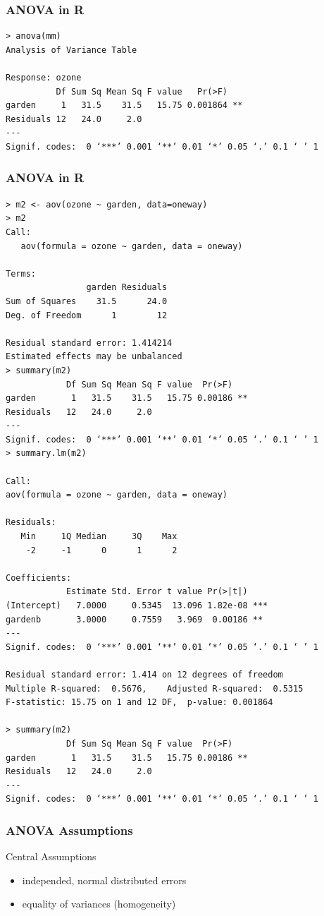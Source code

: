 \begin{frame}[fragile]\frametitle{ANOVA in R}
\footnotesize
\begin{verbatim}
> anova(mm)
Analysis of Variance Table

Response: ozone
          Df Sum Sq Mean Sq F value   Pr(>F)   
garden     1   31.5    31.5   15.75 0.001864 **
Residuals 12   24.0     2.0                    
---
Signif. codes:  0 ‘***’ 0.001 ‘**’ 0.01 ‘*’ 0.05 ‘.’ 0.1 ‘ ’ 1
\end{verbatim}
\end{frame}



\begin{frame}\frametitle{ANOVA in R}
\footnotesize
\begin{verbatim}
> m2 <- aov(ozone ~ garden, data=oneway)
> m2
Call:
   aov(formula = ozone ~ garden, data = oneway)

Terms:
                garden Residuals
Sum of Squares    31.5      24.0
Deg. of Freedom      1        12

Residual standard error: 1.414214
Estimated effects may be unbalanced
> summary(m2)
            Df Sum Sq Mean Sq F value  Pr(>F)   
garden       1   31.5    31.5   15.75 0.00186 **
Residuals   12   24.0     2.0                   
---
Signif. codes:  0 ‘***’ 0.001 ‘**’ 0.01 ‘*’ 0.05 ‘.’ 0.1 ‘ ’ 1
> summary.lm(m2)

Call:
aov(formula = ozone ~ garden, data = oneway)

Residuals:
   Min     1Q Median     3Q    Max 
    -2     -1      0      1      2 

Coefficients:
            Estimate Std. Error t value Pr(>|t|)    
(Intercept)   7.0000     0.5345  13.096 1.82e-08 ***
gardenb       3.0000     0.7559   3.969  0.00186 ** 
---
Signif. codes:  0 ‘***’ 0.001 ‘**’ 0.01 ‘*’ 0.05 ‘.’ 0.1 ‘ ’ 1

Residual standard error: 1.414 on 12 degrees of freedom
Multiple R-squared:  0.5676,	Adjusted R-squared:  0.5315 
F-statistic: 15.75 on 1 and 12 DF,  p-value: 0.001864

> summary(m2)
            Df Sum Sq Mean Sq F value  Pr(>F)   
garden       1   31.5    31.5   15.75 0.00186 **
Residuals   12   24.0     2.0                   
---
Signif. codes:  0 ‘***’ 0.001 ‘**’ 0.01 ‘*’ 0.05 ‘.’ 0.1 ‘ ’ 1
\end{verbatim}
\end{frame}



\begin{frame}\frametitle{ANOVA Assumptions}
  \begin{alertblock}{Central Assumptions}
  \begin{itemize}
  \item independed, normal distributed errors
  \item equality of variances (homogeneity)
  \end{itemize}
  \end{alertblock}
\end{frame}


